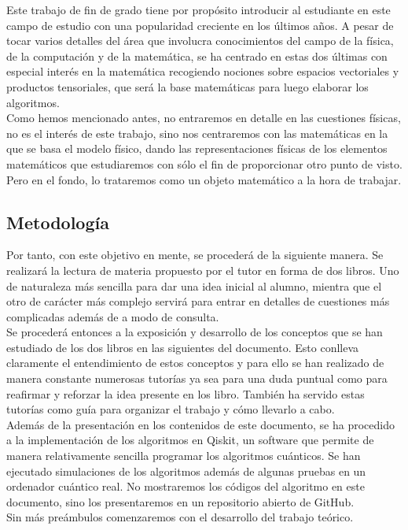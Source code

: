 \documentclass[a4paper]{article}
\numberwithin{equation}{section}
\begin{document}
Este trabajo de fin de grado tiene por propósito introducir al estudiante en este campo de estudio con una popularidad creciente en los últimos años. A pesar de tocar varios detalles del área que involucra conocimientos del campo de la física, de la computación y de la matemática, se ha centrado en estas dos últimas con especial interés en la matemática recogiendo nociones sobre espacios vectoriales y productos tensoriales, que será la base matemáticas para luego elaborar los algoritmos.\\
\linebreak
Como hemos mencionado antes, no entraremos en detalle en las cuestiones físicas, no es el interés de este trabajo, sino nos centraremos con las matemáticas en la que se basa el modelo físico, dando las representaciones físicas de los elementos matemáticos que estudiaremos con sólo el fin de proporcionar otro punto de visto. Pero en el fondo, lo trataremos como un objeto matemático a la hora de trabajar.\\

\subsection{Metodología}

Por tanto, con este objetivo en mente, se procederá de la siguiente manera. Se realizará la lectura de materia propuesto por el tutor en forma de dos libros. Uno de naturaleza más sencilla para dar una idea inicial al alumno, mientra que el otro de carácter más complejo servirá para entrar en detalles de cuestiones más complicadas además de a modo de consulta.\\
\linebreak
Se procederá entonces a la exposición y desarrollo de los conceptos que se han estudiado de los dos libros en las siguientes del documento. Esto conlleva claramente el entendimiento de estos conceptos y para ello se han realizado de manera constante numerosas tutorías ya sea para una duda puntual como para reafirmar y reforzar la idea presente en los libro. También ha servido estas tutorías como guía para organizar el trabajo y cómo llevarlo a cabo.\\
\linebreak
Además de la presentación en los contenidos de este documento, se ha procedido a la implementación de los algoritmos en Qiskit, un software que permite de manera relativamente sencilla programar los algoritmos cuánticos. Se han ejecutado simulaciones de los algoritmos además de algunas pruebas en un ordenador cuántico real. No mostraremos los códigos del algoritmo en este documento, sino los presentaremos en un repositorio abierto de GitHub.\\
\linebreak
Sin más preámbulos comenzaremos con el desarrollo del trabajo teórico.
\end{document}
